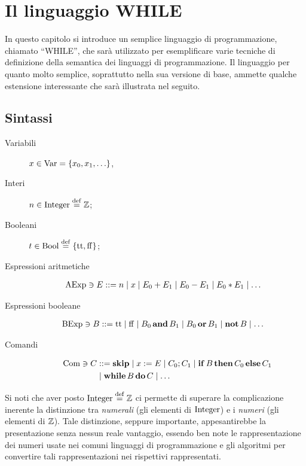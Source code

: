 \chapter{Il linguaggio WHILE}

In questo capitolo si introduce un semplice linguaggio di programmazione,
chiamato ``WHILE'',
che sarà utilizzato per esemplificare varie tecniche di definizione della
semantica dei linguaggi di programmazione.
Il linguaggio per quanto molto semplice, soprattutto nella sua versione di
base, ammette qualche estensione interessante che sarà illustrata nel
seguito.

\section{Sintassi}

\begin{description}
\item[Variabili]
$x \in \mathrm{Var} = \{ x_0, x_1, \ldots \}$,%
\item[Interi]
$n \in \Integer \defeq \Zset$;
\item[Booleani]
$t \in \Bool \defeq \{ \ttv, \ffv \}$;
\item[Espressioni aritmetiche]%
\begin{align*}
  \mathrm{AExp} \ni
  E &::= n \mathrel{\mid} x \mathrel{\mid} E_0 + E_1 \mathrel{\mid} E_0 - E_1 \mathrel{\mid} E_0 * E_1 \mathrel{\mid} \ldots
\end{align*}
\item[Espressioni booleane]%
\begin{align*}
  \mathrm{BExp} \ni
  B &::= \mathrm{tt} \mathrel{\mid} \mathrm{ff} \mathrel{\mid} B_0 \mathop{\textup{\textbf{and}}} B_1 \mathrel{\mid} B_0 \mathop{\textup{\textbf{or}}} B_1
              \mathrel{\mid} \mathop{\textup{\textbf{not}}} B \mathrel{\mid} \ldots
\end{align*}
\item[Comandi]%
\begin{align*}
  \mathrm{Com} \ni
  C &::= \mathop{\textup{\textbf{skip}}} \mathrel{\mid} x := E \mathrel{\mid} C_0 ; C_1
         \mathrel{\mid} \mathop{\textup{\textbf{if}}} B \mathop{\textup{\textbf{then}}} C_0 \mathop{\textup{\textbf{else}}} C_1 \\
    &\mathrel{\mid} \mathop{\textup{\textbf{while}}} B \mathop{\textup{\textbf{do}}} C \mathrel{\mid} \ldots
\end{align*}
\end{description}

Si noti che aver posto $\Integer \defeq \Zset$ ci permette di superare
la complicazione inerente la distinzione tra \emph{numerali} (gli elementi
di $\mathrm{Integer}$) e i \emph{numeri} (gli elementi di $\mathbb{Z}$).
Tale distinzione, seppure importante, appesantirebbe la presentazione
senza nessun reale vantaggio, essendo ben note le rappresentazione
dei numeri usate nei comuni linguaggi di programmazione e gli algoritmi
per convertire tali rappresentazioni nei rispettivi rappresentati.

